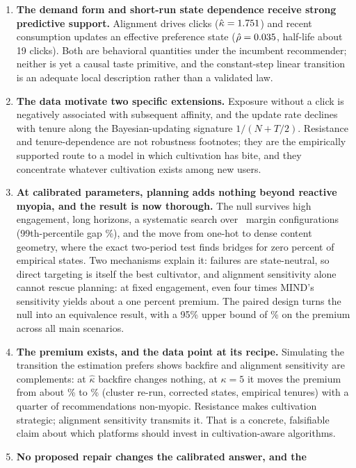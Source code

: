 \documentclass[11pt]{article}
\begin{document}
\begin{enumerate}
\item \textbf{The demand form and short-run state dependence receive strong
predictive support.} Alignment drives clicks ($\hat\kappa=1.751$) and
recent consumption updates an effective preference state
($\hat\rho=0.035$, half-life about 19 clicks). Both are behavioral
quantities under the incumbent recommender; neither is yet a causal taste
primitive, and the constant-step linear transition is an adequate local
description rather than a validated law.
\item \textbf{The data motivate two specific extensions.} Exposure without
a click is negatively associated with subsequent affinity, and the update
rate declines with tenure along the Bayesian-updating signature
$1/(N+T/2)$. Resistance and tenure-dependence are not robustness
footnotes; they are the empirically supported route to a model in which
cultivation has bite, and they concentrate whatever cultivation exists
among new users.
\item \textbf{At calibrated parameters, planning adds nothing beyond
reactive myopia, and the result is now thorough.} The null survives high
engagement, long horizons, a systematic search over \arcnvec\ margin
configurations (99th-percentile gap \arcpninenine\%),
and the move from one-hot to dense content geometry, where the exact
two-period test finds bridges for zero percent of empirical states. Two
mechanisms explain it: failures are state-neutral, so direct targeting is
itself the best cultivator, and alignment sensitivity alone cannot rescue
planning: at fixed engagement, even four times MIND's sensitivity yields
about a one percent premium. The paired design turns the null into an
equivalence result, with a 95\% upper bound of \equivbound\% on the
premium across all main scenarios.
\item \textbf{The premium exists, and the data point at its recipe.}
Simulating the transition the estimation prefers shows backfire and
alignment sensitivity are complements: at $\hat\kappa$ backfire changes
nothing, at $\kappa=5$ it moves the premium from about
\arcbffivezero\% to \arcbffive\% (cluster re-run, corrected states,
empirical tenures) with a quarter of recommendations non-myopic. Resistance
makes cultivation strategic; alignment sensitivity transmits it. That is
a concrete, falsifiable claim about which platforms should invest in
cultivation-aware algorithms.
\item \textbf{No proposed repair changes the calibrated answer, and the
}
\end{enumerate}
\end{document}
